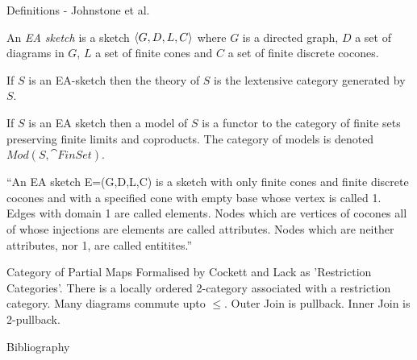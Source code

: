 \begin{frame}{Definitions - Johnstone et al.}

An \textit{EA sketch} is a sketch $\langle G,D,L,C\rangle$ where $G$ is a directed graph, $D$ a set of diagrams in $G$, $L$ a set of finite cones and
$C$ a set of finite discrete cocones.

If $S$ is an EA-sketch then the theory of $S$ is the lextensive category generated by $S$.

If $S$ is an EA sketch then a model of $S$ is a functor to the category of finite sets preserving finite limits and coproducts.
The category of models is denoted $Mod(S,\cat{FinSet})$.
\end{frame}

\begin{frame}{\cite{Johnson2002ERA}}

``An EA sketch E=(G,D,L,C) is a sketch with only finite cones and finite discrete cocones and with a 
specified cone with empty base whose vertex is called 1. Edges with domain 1 are called elements. 
Nodes which are vertices of cocones all of whose injections are elements are called attributes. 
Nodes which are neither attributes, nor 1, are called entitites.''
\end{frame}

\begin{frame}{Category of Partial Maps}
Formalised by Cockett and Lack as 'Restriction Categories'.
There is a locally ordered 2-category associated with a restriction category.
Many diagrams commute upto $\leq$.
Outer Join is pullback.
Inner Join is 2-pullback.
\end{frame}

\begin{frame}{Bibliography}
{\tiny

}
\end{frame}

